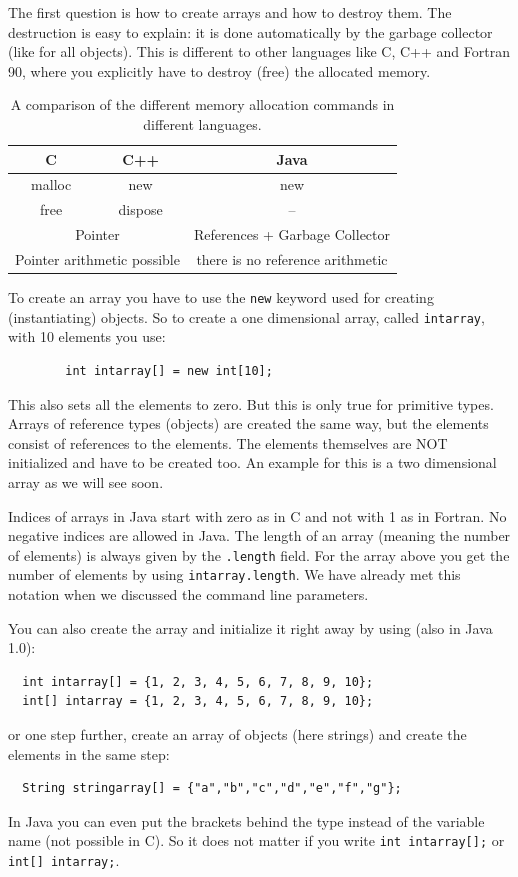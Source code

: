 The first question is how to create arrays and how to destroy them.
The destruction is easy to explain: it is done automatically
by the garbage collector (like for all objects). This is different to
other languages like C, C++ and Fortran 90, where you explicitly
have to destroy (free) the allocated memory. 
\begin{table}[htbp]
  \begin{center}
    \begin{tabular}{c|c|c}
      C & C++ & Java \\\hline
      malloc & new & new \\
      free & dispose & -- \\
      \multicolumn{2}{c}{Pointer} & References + Garbage Collector \\
      \multicolumn{2}{c}{Pointer arithmetic possible}& there is no 
                                                    reference arithmetic \\
    \end{tabular}
    \caption{A comparison of the different memory allocation commands in different languages.}
    \label{tab:MemoryAllocation}
  \end{center}
\end{table}
To create an array you have to use the \verb|new| keyword used for
creating (instantiating) objects. So to create a one dimensional
array, called \verb|intarray|, with 10 elements you use:
\begin{verbatim}
        int intarray[] = new int[10];
\end{verbatim}
This also sets all the elements to zero. But this is only true for 
primitive types. Arrays of reference types (objects) are created the
same way, but the elements consist of references to the elements. The
elements themselves are NOT initialized and have to be created too.
An example for this is a two dimensional array as we will see soon.

Indices of arrays in Java start with zero as in C and not with 1
as in Fortran. No negative indices are allowed in Java. The length
of an array (meaning the number of elements) is always given
by the \verb|.length| field. For the array above you get the number
of elements by using \verb|intarray.length|. We have already met
this notation when we discussed the command line parameters.

You can also create the array and initialize it right away by using
(also in Java 1.0):
\begin{verbatim}
  int intarray[] = {1, 2, 3, 4, 5, 6, 7, 8, 9, 10};
  int[] intarray = {1, 2, 3, 4, 5, 6, 7, 8, 9, 10};
\end{verbatim}
or one step further, create an array of objects (here strings) and
create the elements in the same step:
\begin{verbatim}
  String stringarray[] = {"a","b","c","d","e","f","g"};
\end{verbatim}
In Java you can even put the brackets behind the type instead of the
variable name (not possible in C). So it does not matter if you
write \verb|int intarray[];| or \verb|int[] intarray;|.

